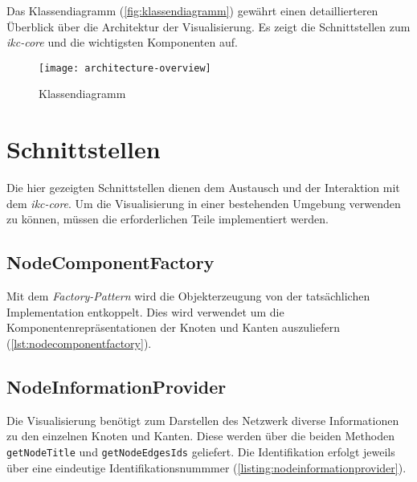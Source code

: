 Das Klassendiagramm (\autoref{fig:klassendiagramm}) gewährt einen detaillierteren Überblick über die Architektur der Visualisierung. Es zeigt die Schnittstellen zum \textit{ikc-core} und die wichtigsten Komponenten auf.


\begin{landscape}

\begin{figure}[H]
\centering
\texttt{[image: architecture-overview]}
\caption{Klassendiagramm}
\label{fig:klassendiagramm}
\end{figure}
\end{landscape}


\section{Schnittstellen} \label{schnittstellen}


Die hier gezeigten Schnittstellen dienen dem Austausch und der Interaktion mit dem \textit{ikc-core}. Um die Visualisierung in einer bestehenden Umgebung verwenden zu können, müssen die erforderlichen Teile implementiert werden.

\subsection{NodeComponentFactory}
Mit dem \textit{Factory-Pattern} wird die Objekterzeugung von der tatsächlichen Implementation entkoppelt. Dies wird verwendet um die Komponentenrepräsentationen der Knoten und Kanten auszuliefern (\autoref{lst:nodecomponentfactory}).


\subsection{NodeInformationProvider}
Die Visualisierung benötigt zum Darstellen des Netzwerk diverse Informationen zu den einzelnen Knoten und Kanten. Diese werden über die beiden Methoden \texttt{getNodeTitle} und \texttt{getNodeEdgesIds} geliefert. Die Identifikation erfolgt jeweils über eine eindeutige Identifikationsnummmer (\autoref{listing:nodeinformationprovider}).

